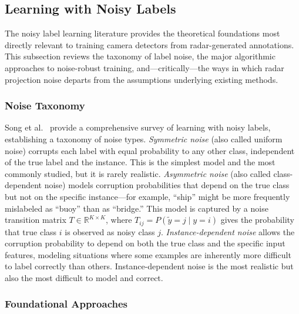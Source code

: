 \subsection{Learning with Noisy Labels}\label{subsec:noisy_labels}

The noisy label learning literature provides the theoretical foundations most directly relevant to training camera detectors from radar-generated annotations. This subsection reviews the taxonomy of label noise, the major algorithmic approaches to noise-robust training, and---critically---the ways in which radar projection noise departs from the assumptions underlying existing methods.

\subsubsection{Noise Taxonomy}

Song et al.~\cite{song2022learning} provide a comprehensive survey of learning with noisy labels, establishing a taxonomy of noise types. \emph{Symmetric noise} (also called uniform noise) corrupts each label with equal probability to any other class, independent of the true label and the instance. This is the simplest model and the most commonly studied, but it is rarely realistic. \emph{Asymmetric noise} (also called class-dependent noise) models corruption probabilities that depend on the true class but not on the specific instance---for example, ``ship'' might be more frequently mislabeled as ``buoy'' than as ``bridge.'' This model is captured by a noise transition matrix $T \in \mathbb{R}^{K \times K}$, where $T_{ij} = P(\tilde{y} = j \mid y = i)$ gives the probability that true class $i$ is observed as noisy class $j$. \emph{Instance-dependent noise} allows the corruption probability to depend on both the true class and the specific input features, modeling situations where some examples are inherently more difficult to label correctly than others. Instance-dependent noise is the most realistic but also the most difficult to model and correct.

\subsubsection{Foundational Approaches}

